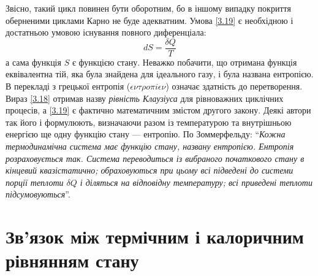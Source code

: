 Звісно, такий цикл повинен бути оборотним, бо в іншому випадку покриття оберненими циклами Карно не
буде
адекватним. Умова \eqref{3.19} є необхідною і достатньою умовою існування повного диференціала:
\begin{equation}\label{3.19}
	dS = \dfrac{\delta Q}{T}
\end{equation}
а сама функція $S$ є функцією стану. Неважко побачити, що отримана функція еквівалентна тій, яка була
знайдена для ідеального газу, і була названа ентропією. В перекладі з грецької ентропія
($\epsilon\nu\tau\rho
o\pi i \epsilon\nu$) означає здатність до перетворення. Вираз \eqref{3.18} отримав назву
\emph{рівність Клаузіуса} для рівноважних циклічних процесів, а \eqref{3.19} є фактично математичним
змістом другого закону.  Деякі автори так його і формулюють, визначаючи разом із температурою та
внутрішньою енергією ще одну функцію стану --- ентропію. По Зоммерфельду: \enquote{\emph{Кожна
термодинамічна система має функцію стану, названу ентропією. Ентропія розраховується так. Система
переводиться із вибраного початкового стану в кінцевий квазістатично; обраховуються при цьому всі
підведені до системи порції теплоти $\delta Q$ і діляться на відповідну температуру; всі приведені
теплоти підсумовуються}}.

\section{Зв'язок між термічним і калоричним рівнянням стану}

